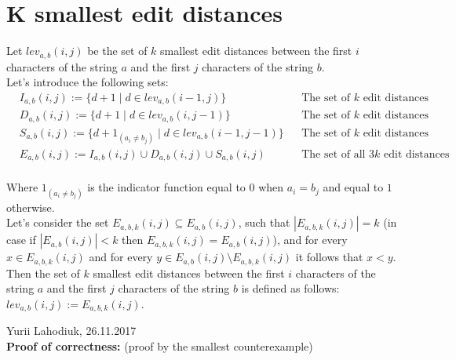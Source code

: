 \documentclass[fleqn,leqno]{article}
\begin{document}
\setlength{\parindent}{0pt}

\section*{K smallest edit distances}

Let $lev_{a,b}(i, j)$ be the set of $k$ smallest edit distances between the first $i$ characters of the string $a$ and the first $j$ characters of the string $b$. \\

Let's introduce the following sets:
\begin{equation*}
\begin{split}
	      & I_{a,b}(i, j) := \{ d + 1 \mid d \in lev_{a,b}(i - 1, j) \}  && \text{The set of $k$ edit distances obtained through insertions} \\
	      & D_{a,b}(i, j) := \{ d + 1 \mid d \in lev_{a,b}(i, j - 1) \} && \text{The set of $k$ edit distances obtained through deletions} \\
	      & S_{a,b}(i, j) := \{ d + 1_{(a_i \neq b_j)} \mid d \in lev_{a,b}(i - 1, j - 1) \} && \text{The set of $k$ edit distances obtained through substitutions} \\ 
	      & E_{a,b}(i, j) := I_{a,b}(i, j) \cup D_{a,b}(i, j) \cup S_{a,b}(i, j) && \text{The set of all $3k$ edit distances}  \\
\end{split}
\end{equation*}

Where $1_{(a_i \neq b_j)}$ is the indicator function equal to $0$ when $a_{i}=b_{j}$ and equal to $1$ otherwise. \\

Let's consider the set $E_{a,b,k}(i, j) \subseteq E_{a,b}(i, j)$, such that $|E_{a,b,k}(i, j)| = k$  (in case if $|E_{a,b}(i, j)| < k$ then $E_{a,b,k}(i, j) = E_{a,b}(i, j)$), and for every $x \in E_{a,b,k}(i, j)$ and for every $y \in E_{a,b}(i, j) \setminus E_{a,b,k}(i, j)$ it follows that $x < y$. \\

Then the set of $k$ smallest edit distances between the first $i$ characters of the string $a$ and the first $j$ characters of the string $b$ is defined as follows: $lev_{a,b}(i, j) := E_{a,b,k}(i, j)$.

\hfill Yurii Lahodiuk, 26.11.2017 \newline \\

\textbf{Proof of correctness:} (proof by the smallest counterexample) \\
\end{document}
